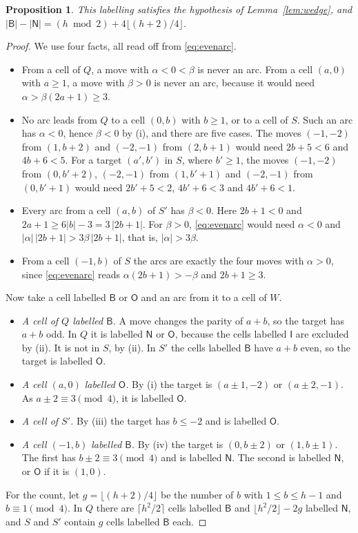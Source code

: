 \documentclass[11pt]{amsart}
\newtheorem{proposition}[theorem]{Proposition}
\theoremstyle{remark}
\begin{document}
\begin{proposition}\label{prop:evenlabel}
This labelling satisfies the hypothesis of Lemma~\ref{lem:wedge}, and
$|\mathsf B|-|\mathsf N|=(h\bmod2)+4\lfloor(h+2)/4\rfloor$.
\end{proposition}
\begin{proof}
We use four facts, all read off from \eqref{eq:evenarc}.
\begin{itemize}
\item[(i)] From a cell of $Q$, a move with $\alpha<0<\beta$ is never an arc. From a cell $(a,0)$ with $a\ge1$, a move
with $\beta>0$ is never an arc, because it would need $\alpha>\beta(2a+1)\ge3$.
\item[(ii)] No arc leads from $Q$ to a cell $(0,b)$ with $b\ge1$, or to a cell of $S$. Such an arc has $\alpha<0$,
hence $\beta<0$ by (i), and there are five cases. The moves $(-1,-2)$ from $(1,b+2)$ and $(-2,-1)$ from $(2,b+1)$
would need $2b+5<6$ and $4b+6<5$. For a target $(a',b')$ in $S$, where $b'\ge1$, the moves $(-1,-2)$ from
$(0,b'+2)$, $(-2,-1)$ from $(1,b'+1)$ and $(-2,-1)$ from $(0,b'+1)$ would need $2b'+5<2$, $4b'+6<3$ and $4b'+6<1$.
\item[(iii)] Every arc from a cell $(a,b)$ of $S'$ has $\beta<0$. Here $2b+1<0$ and $2a+1\ge6|b|-3=3\,|2b+1|$. For
$\beta>0$, \eqref{eq:evenarc} would need $\alpha<0$ and $|\alpha|\,|2b+1|>3\beta\,|2b+1|$, that is, $|\alpha|>3\beta$.
\item[(iv)] From a cell $(-1,b)$ of $S$ the arcs are exactly the four moves with $\alpha>0$, since
\eqref{eq:evenarc} reads $\alpha(2b+1)>-\beta$ and $2b+1\ge3$.
\end{itemize}
Now take a cell labelled $\mathsf B$ or $\mathsf O$ and an arc from it to a cell of $W$.
\begin{itemize}
\item \emph{A cell of $Q$ labelled $\mathsf B$.} A move changes the parity of $a+b$, so the target has $a+b$ odd.
In $Q$ it is labelled $\mathsf N$ or $\mathsf O$, because the cells labelled $\mathsf I$ are excluded by (ii). It is
not in $S$, by (ii). In $S'$ the cells labelled $\mathsf B$ have $a+b$ even, so the target is labelled $\mathsf O$.
\item \emph{A cell $(a,0)$ labelled $\mathsf O$.} By (i) the target is $(a\pm1,-2)$ or $(a\pm2,-1)$. As
$a\pm2\equiv3\pmod4$, it is labelled $\mathsf O$.
\item \emph{A cell of $S'$.} By (iii) the target has $b\le-2$ and is labelled $\mathsf O$.
\item \emph{A cell $(-1,b)$ labelled $\mathsf B$.} By (iv) the target is $(0,b\pm2)$ or $(1,b\pm1)$. The first has
$b\pm2\equiv3\pmod4$ and is labelled $\mathsf N$. The second is labelled $\mathsf N$, or $\mathsf O$ if it is $(1,0)$.
\end{itemize}
For the count, let $g=\lfloor(h+2)/4\rfloor$ be the number of $b$ with $1\le b\le h-1$ and $b\equiv1\pmod4$. In $Q$
there are $\lceil h^2/2\rceil$ cells labelled $\mathsf B$ and $\lfloor h^2/2\rfloor-2g$ labelled $\mathsf N$, and $S$
and $S'$ contain $g$ cells labelled $\mathsf B$ each.
\end{proof}
\end{document}
